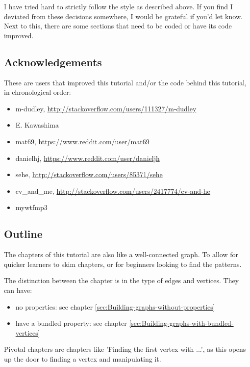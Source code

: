 I have tried hard to strictly follow the style as described above.
If you find I deviated from these decisions somewhere, I would be grateful
if you'd let know.
Next to this, there are some sections that need to be coded or have its
code improved.

\subsection{Acknowledgements}

These are users that improved this tutorial and/or the code behind this
tutorial, in chronological order:

\begin{itemize}
  \item m-dudley, \url{http://stackoverflow.com/users/111327/m-dudley}
  \item E. Kawashima
  \item mat69, \url{https://www.reddit.com/user/mat69}
  \item danielhj, \url{https://www.reddit.com/user/danieljh}
  \item sehe, \url{http://stackoverflow.com/users/85371/sehe}
  \item cv\_and\_me, \url{http://stackoverflow.com/users/2417774/cv-and-he}
  \item mywtfmp3
\end{itemize}

\subsection{Outline}

The chapters of this tutorial are also like a well-connected graph.
To allow for quicker learners to skim chapters, or for beginners looking
to find the patterns.

The distinction between the chapter is in the type of edges and vertices.
They can have:

\begin{itemize}
  \item no properties: 
    see chapter \ref{sec:Building-graphs-without-properties}
  \item have a bundled property: 
    see chapter \ref{sec:Building-graphs-with-bundled-vertices}
\end{itemize}

Pivotal chapters are chapters like 'Finding the first vertex with ...', as
this opens up the door to finding a vertex and manipulating it.

